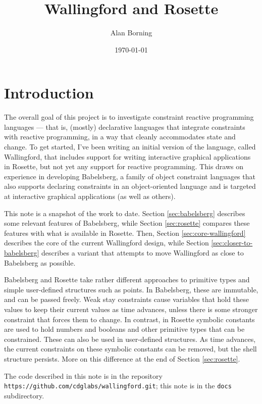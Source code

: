 \documentclass{article}
\begin{document}
\title{Wallingford and Rosette}
\author{Alan Borning}
\date{\today}

\maketitle

\section{Introduction}

The overall goal of this project is to investigate constraint reactive
programming languages --- that is, (mostly) declarative languages that
integrate constraints with reactive programming, in a way that cleanly
accommodates state and change.  To get started, I've been writing an
initial version of the language, called Wallingford, that includes support
for writing interactive graphical applications in Rosette, but not yet
any support for reactive programming.  This draws on experience in
developing Babelsberg, a family of object constraint languages that
also supports declaring constraints in an object-oriented language and
is targeted at interactive graphical applications (as well as others).

This note is a snapshot of the work to date.  Section
\ref{sec:babelsberg} describes some relevant features of Babelsberg,
while Section \ref{sec:rosette} compares these features with what is
available in Rosette.  Then, Section \ref{sec:core-wallingford}
describes the core of the current Wallingford design, while Section
\ref{sec:closer-to-babelsberg} describes a variant that attempts to
move Wallingford as close to Babelsberg as possible.

Babelsberg and Rosette take rather different approaches to primitive
types and simple user-defined structures such as points.  In
Babelsberg, these are immutable, and can be passed freely.  Weak stay
constraints cause variables that hold these values to keep their
current values as time advances, unless there is some stronger
constraint that forces them to change.  In contrast, in Rosette
symbolic constants are used to hold numbers and booleans and other
primitive types that can be constrained.  These can also be used in
user-defined structures.  As time advances, the current constraints on
these symbolic constants can be removed, but the shell structure
persists.  More on this difference at the end of Section \ref{sec:rosette}.

The code described in this note is in the repository
\verb|https://github.com/cdglabs/wallingford.git|; this note is in
the \verb|docs| subdirectory.
\end{document}
